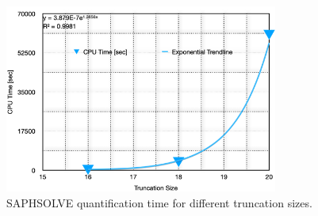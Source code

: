 \begin{figure}[H]
    \centering
    \includegraphics[width=0.8\textwidth]{3_identifying_gaps/benchmarking/profiling_methods/figures/saphsolve_truncation_time.png}
    \caption{SAPHSOLVE quantification time for different truncation sizes.}
    \label{fig:saphsolve_truncation_time}
\end{figure}